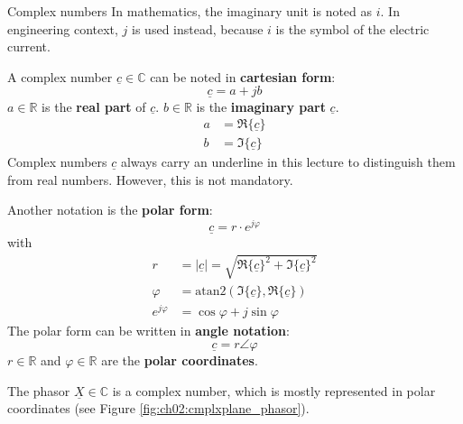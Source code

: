 \begin{refsection}
\begin{excursus}{Complex numbers}
	In mathematics, the imaginary unit is noted as $i$. In engineering context, $j$ is used instead, because $i$ is the symbol of the electric current.
	
	A complex number $\underline{c} \in \mathbb{C}$ can be noted in  \textbf{cartesian form}:
	\begin{equation}
		\underline{c} = a + j b
	\end{equation}
	$a \in \mathbb{R}$ is the  \textbf{real part} of $\underline{c}$. $b \in \mathbb{R}$ is the  \textbf{imaginary part} $\underline{c}$.
	\begin{subequations}
		\begin{align}
			a &= \Re\{\underline{c}\} \\
			b &= \Im\{\underline{c}\}
		\end{align}
	\end{subequations}
	Complex numbers $\underline{c}$ always carry an underline in this lecture to distinguish them from real numbers. However, this is not mandatory.

	Another notation is the  \textbf{polar form}:
	\begin{equation}
		\underline{c} = r \cdot e^{j \varphi}
	\end{equation}
	with
	\begin{subequations}
		\begin{align}
			r &= |\underline{c}| = \sqrt{\Re\{\underline{c}\}^2 + \Im\{\underline{c}\}^2} \\
			\varphi &= \mathrm{atan2} \left(\Im\{\underline{c}\}, \Re\{\underline{c}\}\right) \\
			e^{j \varphi} &= \cos \varphi + j \sin \varphi
		\end{align}
	\end{subequations}
	The polar form can be written in  \textbf{angle notation}:
	\begin{equation}
		\underline{c} = r \angle \varphi
	\end{equation}
	$r \in \mathbb{R}$ and $\varphi \in \mathbb{R}$ are the  \textbf{polar coordinates}.
\end{excursus}

The phasor $\underline{X} \in \mathbb{C}$ is a complex number, which is mostly represented in polar coordinates (see Figure \ref{fig:ch02:cmplxplane_phasor}).

\begin{figure}[H]
	\centering
\end{figure}
\end{refsection}
